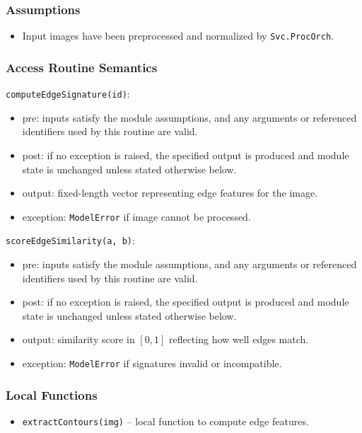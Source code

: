 \documentclass[12pt, titlepage]{article}
\begin{document}
\subsubsection{Assumptions}
\begin{itemize}
    \item Input images have been preprocessed and normalized by \texttt{Svc.ProcOrch}.
\end{itemize}

\subsubsection{Access Routine Semantics}

\noindent \texttt{computeEdgeSignature(id)}:
\begin{itemize}
    \item pre: inputs satisfy the module assumptions, and any arguments or referenced identifiers used by this routine are valid.
    \item post: if no exception is raised, the specified output is produced and module state is unchanged unless stated otherwise below.
    \item output: fixed-length vector representing edge features for the image.
    \item exception: \texttt{ModelError} if image cannot be processed.
\end{itemize}

\noindent \texttt{scoreEdgeSimilarity(a, b)}:
\begin{itemize}
    \item pre: inputs satisfy the module assumptions, and any arguments or referenced identifiers used by this routine are valid.
    \item post: if no exception is raised, the specified output is produced and module state is unchanged unless stated otherwise below.
    \item output: similarity score in \([0, 1]\) reflecting how well edges match.
    \item exception: \texttt{ModelError} if signatures invalid or incompatible.
\end{itemize}

\subsubsection{Local Functions}
\begin{itemize}
    \item \texttt{extractContours(img)} – local function to compute edge features.
\end{itemize}
\end{document}
